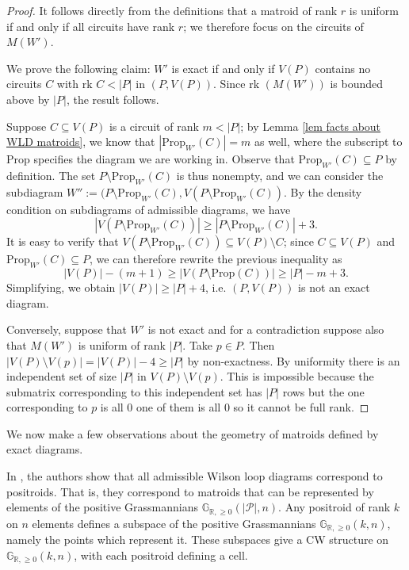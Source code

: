 \documentclass[11pt]{article}
\newcommand{\hlfix}[2]{\texthl{#1}\todo{#2}}
\newcommand{\R}{\mathbb{R}}
\newcommand{\Gr}{\mathbb{G}_{\R, \geq 0}}
\newcommand{\rk}{\textrm{rk }}
\newcommand{\cP}{\mathcal{P}}
\newcommand{\Prop}{\textrm{Prop}}
\theoremstyle{remark}
\theoremstyle{definition}
\begin{document}
\begin{proof}
It follows directly from the definitions that a matroid of rank $r$ is uniform if and only if all circuits have rank $r$; we therefore focus on the circuits of $M(W')$.

We prove the following claim: $W'$ is exact if and only if $V(P)$ contains no circuits $C$ with $\rk C< |P|$ in $(P, V(P))$. Since $\rk(M(W'))$ is bounded above by $|P|$, the result follows.

Suppose $C \subseteq V(P)$ is a circuit of rank $m < |P|$; by Lemma \ref{lem facts about WLD matroids}, we know that $|\Prop_{W'}(C)| = m$ as well, where the subscript to $\Prop$ specifies the diagram we are working in.  Observe that $\Prop_{W'}(C)\subseteq P$ by definition. The set $P \setminus \Prop_{W'}(C)$ is thus nonempty, and we can consider the subdiagram $W'':= (P\setminus \Prop_{W'}(C),V(P\setminus\Prop_{W'}(C))$. By the density condition on subdiagrams of admissible diagrams, we have
\[|V(P\setminus\Prop_{W'}(C))| \geq |P\setminus\Prop_{W'}(C)| + 3.\]
It is easy to verify that $V(P\setminus\Prop_{W'}(C)) \subseteq V(P)\setminus C$; since $C \subseteq V(P)$ and $\Prop_{W'}(C) \subseteq P$, we can therefore rewrite the previous inequality as
\[|V(P)| - (m+1) \geq |V(P\setminus\Prop(C))| \geq |P| - m + 3.\]
Simplifying, we obtain $|V(P)| \geq |P| + 4$, i.e. $(P,V(P))$ is not an exact diagram.

Conversely, suppose that $W'$ is not exact and for a contradiction suppose also that $M(W')$ is uniform of rank $|P|$.  Take $p \in P$.  Then $|V(P)\setminus V(p)| = |V(P)| - 4 \geq |P|$ by non-exactness.  By uniformity there is an independent set of size $|P|$ in $V(P)\setminus V(p)$.  This is impossible because the submatrix corresponding to this independent set has $|P|$ rows but the one corresponding to $p$ is all $0$ one of them is all 0 so it cannot be full rank.
\end{proof}

We now make a few observations about the geometry of matroids defined by exact diagrams.

In \cite{wilsonloop}, the authors show that all admissible Wilson loop diagrams correspond to positroids. That is, they correspond to matroids that can be represented by elements of the positive Grassmannians $\Gr(|\cP|, n)$. Any positroid of rank $k$ on $n$ elements defines a subspace of the positive Grassmannians $\Gr(k, n)$, namely the points which represent it. These subspaces give a CW structure on $\Gr(k,n)$, with each positroid defining a cell. 
\end{document}
